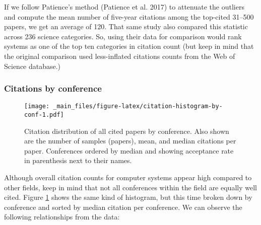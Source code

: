 \documentclass{article}
\begin{document}
If we follow Patience's method (Patience et al. 2017) to attenuate the outliers and compute the mean number of five-year citations among the top-cited 31--500 papers, we get an average of 120.
That same study also compared this statistic across 236 science categories.
So, using their data for comparison would rank systems as one of the top ten categories in citation count (but keep in mind that the original comparison used less-inflated citations counts from the Web of Science database.)

\hypertarget{citations-by-conference}{%
\subsubsection{Citations by conference}\label{citations-by-conference}}

\begin{figure}
\centering
\texttt{[image: \_main\_files/figure-latex/citation-histogram-by-conf-1.pdf]}
\caption{\label{fig:citation-histogram-by-conf}Citation distribution of all cited papers by conference. Also shown are the number of samples (papers), mean, and median citations per paper. Conferences ordered by median and showing acceptance rate in parenthesis next to their names.}
\end{figure}

Although overall citation counts for computer systems appear high compared to other fields, keep in mind that not all conferences within the field are equally well cited.
Figure \ref{fig:citation-histogram-by-conf} shows the same kind of histogram, but this time broken down by conference and sorted by median citation per conference.
We can observe the following relationships from the data:
\end{document}

